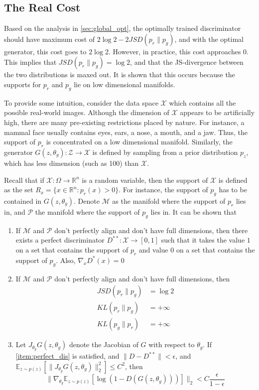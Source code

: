     \subsection{The Real Cost}
    Based on the analysis in \autoref{sec:global_opt}, the optimally trained discriminator should have maximum cost of $2\log2-2JSD(p_r\|p_g)$, and with the optimal generator, this cost goes to $2\log2$. However, in practice, this cost approaches $0$. This implies that $JSD(p_r\|p_g)=\log2$, and that the JS-divergence between the two distributions is maxed out. It is shown that this occurs because the supports for  $p_r$ and $p_g$ lie on low dimensional manifolds.\par
    To provide some intuition, consider the data space $\mathcal{X}$ which contains all the possible real-world images. Although the dimension of $\mathcal{X}$ appears to be artificially high, there are many pre-existing restrictions placed by nature. For instance, a mammal face usually contains eyes, ears, a nose, a mouth, and a jaw. Thus, the support of $p_r$ is concentrated on a low dimensional manifold. Similarly, the generator $G(z, \theta_g): \mathcal{Z} \to \mathcal{X}$ is defined by sampling from a prior distribution $p_z$, which has less dimension (such as 100) than $\mathcal{X}$.\par
    Recall that if $\mathcal{X}: \Omega\to\mathbb{R}^n$ is a random variable, then the support of $\mathcal{X}$ is defined as the set $R_x = \{x\in\mathbb{R}^n: p_r(x)>0\}$. For instance, the support of $p_g$ has to be contained in $G(z, \theta_g)$. Denote $\mathcal{M}$ as the manifold where the support of $p_r$ lies in, and $\mathcal{P}$ the manifold where the support of $p_g$ lies in. It can be shown that
    \begin{enumerate}
        \item \label{item:perfect_dis} If $\mathcal{M}$ and $\mathcal{P}$ don't perfectly align and don't have full dimensions, then there exists a perfect discriminator $D^{**}: \mathcal{X}\to[0,1]$ such that it takes the value $1$ on a set that contains the support of $p_r$ and value $0$ on a set that contains the support of $p_g$. Also, $\nabla_xD^*(x)=0$
        \item \label{item:infy_KL} If $\mathcal{M}$ and $\mathcal{P}$ don't perfectly align and don't have full dimensions, then
            \begin{align*}
                JSD(p_r\|p_g) &= \log2\\
                KL(p_r\|p_g) &= +\infty\\
                KL(p_g\|p_r) &= +\infty
            \end{align*}
        \item \label{item:grad_bound} Let $J_{\theta_g} G(z,\theta_g)$ denote the Jacobian of $G$ with respect to $\theta_g$. If \ref{item:perfect_dis} is satisfied, and $\|D-D^{**}\|<\epsilon$, and $\mathbb{E}_{z\sim p(z)}\left[\|J_{\theta_g} G(z,\theta_g)\|^2_2\right]\leq C^2$, then
        \begin{equation}
            \|\nabla_{\theta_g}\mathbb{E}_{z\sim p(z)}\left[\log(1-D(G(z,\theta_g)))\right]\|_2 < C\frac{\epsilon}{1-\epsilon}
        \end{equation}
    \end{enumerate}
